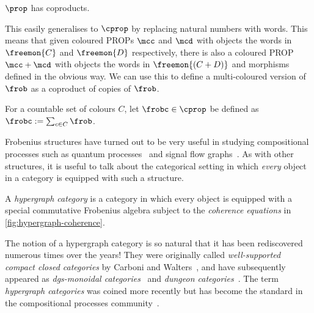 \begin{theorem}
    \(\prop\) has coproducts.
\end{theorem}

This easily generalises to \(\cprop\) by replacing natural numbers with words.
This means that given coloured PROPs \(\mcc\) and \(\mcd\) with objects the
words in \(\freemon{C}\) and \(\freemon{D}\) respectively, there is also a
coloured PROP \(\mcc + \mcd\) with objects the words in \(\freemon{(C + D)}\)
and morphisms defined in the obvious way.
We can use this to define a multi-coloured version of \(\frob\) as
a coproduct of copies of \(\frob\).

\begin{definition}
    \label{def:frobc}
    For a countable set of colours \(C\), let \(\frobc \in \cprop\) be
    defined as \(\frobc := \sum_{c \in C}\frob\).
\end{definition}

Frobenius structures have turned out to be very useful in studying compositional
processes such as quantum processes~\cite{coecke2008interacting} and signal flow
graphs~\cite{bonchi2014categorical,bonchi2015full}.
As with other structures, it is useful to talk about the categorical setting in
which \emph{every} object in a category is equipped with such a structure.

\begin{definition}
    \label{def:hypergraph-category}
    A \emph{hypergraph category} is a category in which every object is equipped
    with a special commutative Frobenius algebra subject to the
    \emph{coherence equations} in \cref{fig:hypergraph-coherence}.
\end{definition}



\begin{remark}
    The notion of a hypergraph category is so natural that it has been
    rediscovered numerous times over the years!
    They were originally called \emph{well-supported compact closed categories}
    by Carboni and Walters~\cite{carboni1987cartesian}, and have subsequently
    appeared as
    \emph{dgs-monoidal categories}~\cite{katis1997bicategories,gadducci1998inductive,gadducci1999bicategorical,bruni2002normal}
    and \emph{dungeon categories}~\cite{morton2014belief}.
    The term \emph{hypergraph categories} was coined more recently but has
    become the standard in the compositional processes
    community~\cite{kissinger2015finite,fong2015decorated,baez2016compositional,baez2018compositional}.
\end{remark}

